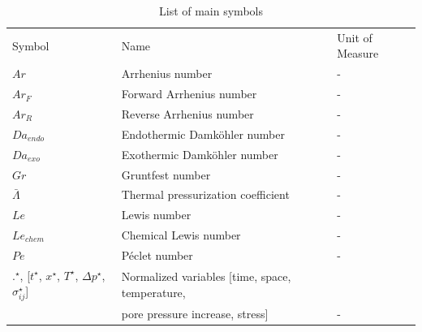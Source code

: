 \documentclass[]{scrreprt}
\begin{document}
\begin{table}
\caption{List of main symbols}
\label{tab:symbols}
\begin{tabular}{lll}
\hline\noalign{\smallskip}
Symbol & Name & Unit of Measure \\
\noalign{\smallskip}\hline\noalign{\smallskip}
$Ar$ & Arrhenius number & - \\
$Ar_F$ & Forward Arrhenius number & - \\
$Ar_R$ & Reverse Arrhenius number & - \\
$Da_{endo}$ & Endothermic Damk\"{o}hler number & - \\
$Da_{exo}$ & Exothermic Damk\"{o}hler number & - \\
$Gr$ & Gruntfest number & - \\
$\bar{\Lambda}$ & Thermal pressurization coefficient & - \\
$Le$ & Lewis number &  - \\
$Le_{chem}$ & Chemical Lewis number &  - \\
$Pe$ & P\'{e}clet number & - \\
\hline

$.^{\star}$, [$t^{\star}$, $x^{\star}$, $T^{\star}$, $\Delta p^{\star}$, $\sigma^{\star}_{ij}$] & Normalized variables [time, space, temperature, \\ & pore pressure increase, stress]& - \\


\end{tabular}
\end{table}
\end{document}
